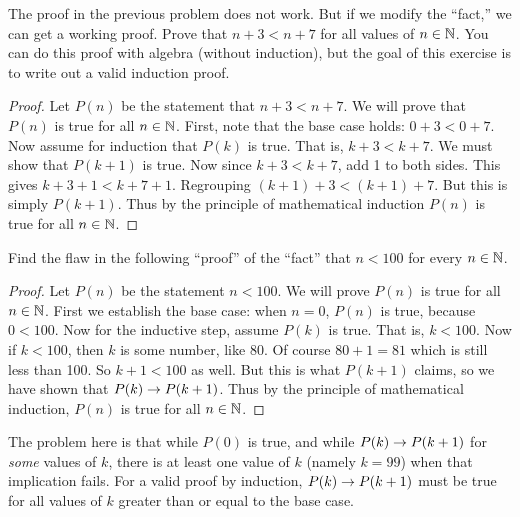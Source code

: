 \begin{questions}
  

\question The proof in the previous problem does not work.  But if we modify the ``fact,'' we can get a working proof.  Prove that $n + 3 < n + 7$ for all values of $n \in \mathbb N$.  You can do this proof with algebra (without induction), but the goal of this exercise is to write out a valid induction proof.

	\begin{answer}
		\begin{proof}
		    Let $P(n)$ be the statement that $n + 3 < n + 7$.  We will prove that $P(n)$ is true for all $n \in \mathbb N$.  First, note that the base case holds: $0+3 < 0+7$.  Now assume for induction that $P(k)$ is true.  That is, $k+3 < k+7$.  We must show that $P(k+1)$ is true.  Now since $k + 3 < k + 7$, add 1 to both sides.  This gives $k + 3 + 1 < k + 7 + 1$.  Regrouping $(k+1) + 3 < (k+1) + 7$.  But this is simply $P(k+1)$.  Thus by the principle of mathematical induction $P(n)$ is true for all $n \in \mathbb N$.
		\end{proof}
	\end{answer}
	
	
	

  
\question  Find the flaw in the following ``proof'' of the ``fact'' that $n < 100$ for every $n \in \mathbb N$.
 \begin{proof}
  Let $P(n)$ be the statement $n < 100$.  We will prove $P(n)$ is true for all $n \in \mathbb N$. First we establish the base case: when $n = 0$, $P(n)$ is true, because $0 < 100$.  Now for the inductive step, assume $P(k)$ is true.  That is, $k < 100$.  Now if $k < 100$, then $k$ is some number, like 80.  Of course $80+1 = 81$ which is still less than 100.  So $k +1 < 100$ as well.  But this is what $P(k+1)$ claims, so we have shown that $P(k) \rightarrow P(k+1)$.  Thus by the principle of mathematical induction, $P(n)$ is true for all $n \in \mathbb N$.
 \end{proof}
 
 	\begin{answer}
 		The problem here is that while $P(0)$ is true, and while $P(k) \rightarrow P(k+1)$ for {\em some} values of $k$, there is at least one value of $k$ (namely $k = 99$) when that implication fails.  For a valid proof by induction, $P(k) \rightarrow P(k+1)$ must be true for all values of $k$ greater than or equal to the base case.
 	\end{answer}
 	
 	
 	
 


\end{questions}
